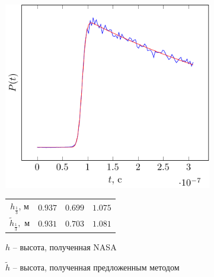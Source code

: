 \documentclass[10pt,pdf,hyperref={unicode}, dvipsnames]{beamer}
\begin{document}
\begin{frame}
\begin{figure}[ht]
\begin{subfigure}{0.42\linewidth}
    \end{subfigure}
    \hfill
    \begin{subfigure}{0.42\linewidth}
        \centering
        \includegraphics[width=\linewidth, page=3]{fig/retracking/real}
    \end{subfigure}
    \hfill
    \begin{subfigure}{0.42\linewidth}
        \centering
        \begin{tabular}{|c|c|c|c|}
            \hline
            $h_{\frac{1}{3}}$, м      & $0.937 $ & $0.699$ & $1.075$ \\
            $\tilde h_{\frac{1}{3}},$ м & $0.931$ & $0.703$ & $1.081$ \\
            \hline
        \end{tabular}

        \vspace{\baselineskip}

        $h$ -- высота, полученная NASA

        $\tilde h$ -- высота, полученная предложенным методом

    \end{subfigure}

\end{figure}
\end{frame}
\end{document}

